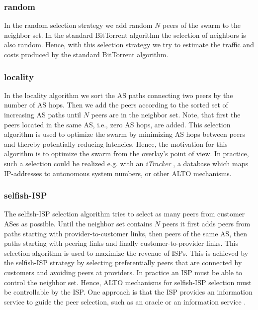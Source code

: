 \subsubsection{random}
In the random selection strategy we add random $N$ peers of the swarm to the neighbor set. In the standard BitTorrent algorithm the selection of neighbors is also random. Hence, with this selection strategy we try to estimate the traffic and costs produced by the standard BitTorrent algorithm.
\subsubsection{locality}
In the locality algorithm we sort the AS paths connecting two peers by the number of AS hops. Then we add the peers according to the sorted set of increasing AS paths until $N$ peers are in the neighbor set. Note, that first the peers located in the same AS, i.e., zero AS hops, are added. This selection algorithm is used to optimize the swarm by minimizing AS hops between peers and thereby potentially reducing latencies. Hence, the motivation for this algorithm is to optimize the swarm from the overlay's point of view.
In practice, such a selection could be realized e.g. with an \emph{iTracker} \cite{Xie2008}, a database which maps IP-addresses to autonomous system numbers, or other ALTO mechanisms.
\subsubsection{selfish-ISP}
The selfish-ISP selection algorithm tries to select as many peers from customer ASes as possible. Until the neighbor set contains $N$ peers it first adds peers from paths starting with provider-to-customer links, then peers of the same AS, then paths starting with peering links and finally customer-to-provider links.
This selection algorithm is used to maximize the revenue of ISPs. This is achieved by the selfish-ISP strategy by selecting preferentially peers that are connected by customers and avoiding peers at providers. In practice an ISP must be able to control the neighbor set. Hence, ALTO mechanisms for selfish-ISP selection must be controllable by the ISP. One approach is that the ISP provides an information service to guide the peer selection, such as an oracle \cite{Aggarwal2007} or an information service \cite{hossfia}.

